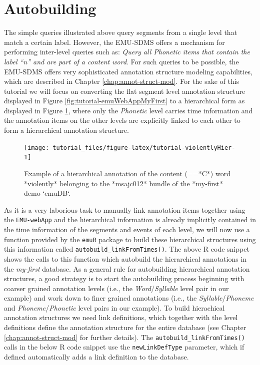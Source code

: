 \documentclass[]{book}
\begin{document}
\hypertarget{autobuilding}{%
\section{Autobuilding}\label{autobuilding}}

The simple queries illustrated above query segments from a single level that match a certain label. However, the EMU-SDMS offers a mechanism for performing inter-level queries such as: \emph{Query all Phonetic items that contain the label ``n'' and are part of a content word}. For such queries to be possible, the EMU-SDMS offers very sophisticated annotation structure modeling capabilities, which are described in Chapter \ref{chap:annot-struct-mod}. For the sake of this tutorial we will focus on converting the flat segment level annotation structure displayed in Figure \ref{fig:tutorial-emuWebAppMyFirst} to a hierarchical form as displayed in Figure \ref{fig:tutorial-violentlyHier}, where only the \emph{Phonetic} level carries time information and the annotation items on the other levels are explicitly linked to each other to form a hierarchical annotation structure.

\begin{figure}

{\centering \texttt{[image: tutorial\_files/figure-latex/tutorial-violentlyHier-1]} 

}

\caption{Example of a hierarchical annotation of the content (==*C*) word *violently* belonging to the *msajc012* bundle of the *my-first* demo `emuDB`.}\label{fig:tutorial-violentlyHier}
\end{figure}

As it is a very laborious task to manually link annotation items together using the \texttt{EMU-webApp} and the hierarchical information is already implicitly contained in the time information of the segments and events of each level, we will now use a function provided by the \texttt{emuR} package to build these hierarchical structures using this information called \texttt{autobuild\_linkFromTimes()}. The above R code snippet shows the calls to this function which autobuild the hierarchical annotations in the \emph{my-first} database. As a general rule for autobuilding hierarchical annotation structures, a good strategy is to start the autobuilding process beginning with coarser grained annotation levels (i.e., the \emph{Word}/\emph{Syllable} level pair in our example) and work down to finer grained annotations (i.e., the \emph{Syllable}/\emph{Phoneme} and \emph{Phoneme}/\emph{Phonetic} level pairs in our example). To build hierachical annotation structures we need link definitions, which together with the level definitions define the annotation structure for the entire database (see Chapter \ref{chap:annot-struct-mod} for further details). The \texttt{autobuild\_linkFromTimes()} calls in the below R code snippet use the \texttt{newLinkDefType} parameter, which if defined automatically adds a link definition to the database.
\end{document}
